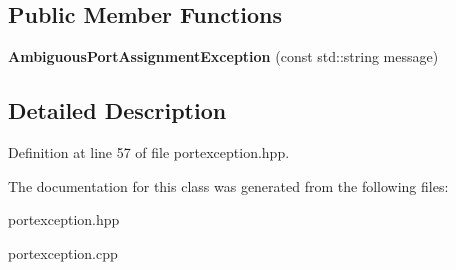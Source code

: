 \subsection*{Public Member Functions}
\begin{DoxyCompactItemize}
\item 
\hypertarget{class_ambiguous_port_assignment_exception_a5c2daf243080521a90629fcc262dec61}{}\label{class_ambiguous_port_assignment_exception_a5c2daf243080521a90629fcc262dec61} 
{\bfseries Ambiguous\+Port\+Assignment\+Exception} (const std\+::string message)
\end{DoxyCompactItemize}


\subsection{Detailed Description}


Definition at line 57 of file portexception.\+hpp.



The documentation for this class was generated from the following files\+:\begin{DoxyCompactItemize}
\item 
portexception.\+hpp\item 
portexception.\+cpp\end{DoxyCompactItemize}
